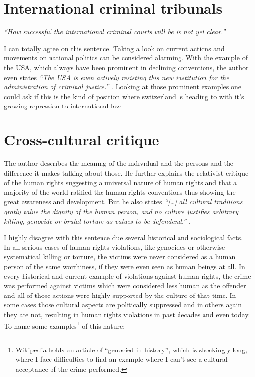 \section{International criminal tribunals}
\emph{``How successful the international criminal courts will be is not yet
clear.''}
\cite[p. 33]{tfohr}

I can totally agree on this sentence. Taking a look on current actions and
movements on national politics can be considered alarming. With the example
of the USA, which always have been prominent in declining conventions, the
author even states \emph{``The USA is even actively resisting this
new institution for the administration of criminal justice.''}
\cite[p. 33]{tfohr}. Looking at those prominent examples one could ask if
this is the kind of position where switzerland is heading to with it's
growing repression to international law.

\section{Cross-cultural critique}
The author describes the meaning of the individual and the persons and the
difference it makes talking about those. He further explains the relativist
critique of the human rights suggesting a universal nature of human rights
and that a majority of the world ratified the human rights conventions thus
showing the great awareness and development. But he also states
\emph{``[\dots] all cultural traditions gratly value the dignity of the human
person, and no culture justifies arbitrary killing, genocide or brutal torture
as values to be defendend.''} \cite[p. 36]{tfohr}.

I highly disagree with this sentence due several historical and sociological
facts. In all serious cases of human rights violations, like genocides or
otherwise systematical killing or torture, the victims were never considered
as a human person of the same worthiness, if they were even seen as human
beings at all. In every historical and current example of violations against
human rights, the crime was performed against victims which were considered
less human as the offender and all of those actions were highly supported by
the culture of that time. In some cases those cultural aspects are politically
suppressed and in others again they are not, resulting in human rights
violations in past decades and even today. To name some
examples\footnote{Wikipedia holds an article of ``genocied in history'',
which is shockingly long, where I face difficulties to find an example where
I can't see a cultural acceptance of the crime performed.} of this nature:

